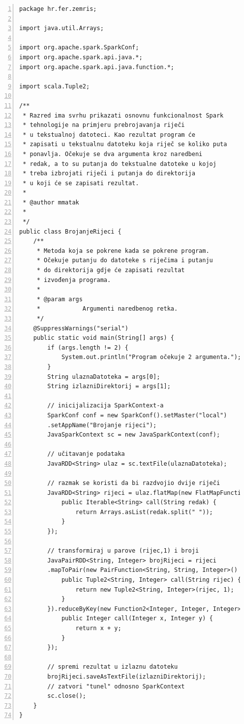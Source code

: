 \documentclass[times, utf8, zavrsni, numeric]{fer}
\begin{document}
\begin{lstlisting}[numbers=left, label={lst:brojanjeRijeci}, caption={Program koji broji koliko se puta koja riječ pojavljuje u datoteci.}]
package hr.fer.zemris;

import java.util.Arrays;

import org.apache.spark.SparkConf;
import org.apache.spark.api.java.*;
import org.apache.spark.api.java.function.*;

import scala.Tuple2;

/**
 * Razred ima svrhu prikazati osnovnu funkcionalnost Spark
 * tehnologije na primjeru prebrojavanja riječi
 * u tekstualnoj datoteci. Kao rezultat program će
 * zapisati u tekstualnu datoteku koja riječ se koliko puta
 * ponavlja. Očekuje se dva argumenta kroz naredbeni 
 * redak, a to su putanja do tekstualne datoteke u kojoj
 * treba izbrojati riječi i putanja do direktorija
 * u koji će se zapisati rezultat.
 *
 * @author mmatak
 *
 */
public class BrojanjeRijeci {
	/**
	 * Metoda koja se pokrene kada se pokrene program.
	 * Očekuje putanju do datoteke s riječima i putanju 
	 * do direktorija gdje će zapisati rezultat
	 * izvođenja programa.
	 *
	 * @param args
	 *            Argumenti naredbenog retka.
	 */
	@SuppressWarnings("serial")
	public static void main(String[] args) {
		if (args.length != 2) {
			System.out.println("Program očekuje 2 argumenta.");
		}
		String ulaznaDatoteka = args[0];
		String izlazniDirektorij = args[1];

		// inicijalizacija SparkContext-a
		SparkConf conf = new SparkConf().setMaster("local")
		.setAppName("Brojanje rijeci");
		JavaSparkContext sc = new JavaSparkContext(conf);

		// učitavanje podataka
		JavaRDD<String> ulaz = sc.textFile(ulaznaDatoteka);

		// razmak se koristi da bi razdvojio dvije riječi
		JavaRDD<String> rijeci = ulaz.flatMap(new FlatMapFunction<String, String>() {
			public Iterable<String> call(String redak) {
				return Arrays.asList(redak.split(" "));
			}
		});

		// transformiraj u parove (rijec,1) i broji
		JavaPairRDD<String, Integer> brojRijeci = rijeci
		.mapToPair(new PairFunction<String, String, Integer>() {
			public Tuple2<String, Integer> call(String rijec) {
				return new Tuple2<String, Integer>(rijec, 1);
			}
		}).reduceByKey(new Function2<Integer, Integer, Integer>() {
			public Integer call(Integer x, Integer y) {
				return x + y;
			}
		});

		// spremi rezultat u izlaznu datoteku
		brojRijeci.saveAsTextFile(izlazniDirektorij);
		// zatvori "tunel" odnosno SparkContext
		sc.close();
	}
}
\end{lstlisting}
\vspace{5mm}
\end{document}
